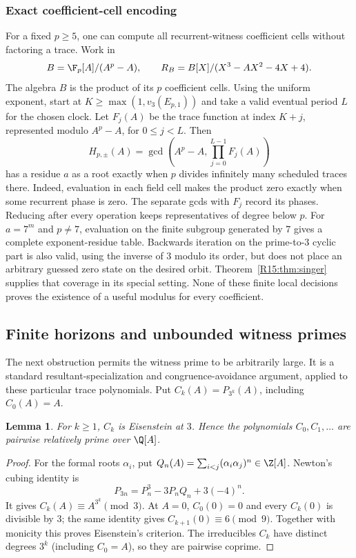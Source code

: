 \documentclass[11pt,a4paper]{article}
\newtheorem{lemma}[theorem]{Lemma}\newtheorem{proposition}[theorem]{Proposition}
\theoremstyle{definition}\newtheorem{definition}[theorem]{Definition}
\theoremstyle{remark}\newtheorem{remark}[theorem]{Remark}
\begin{document}
\subsubsection{Exact coefficient-cell encoding}

For a fixed $p\ge5$, one can compute all recurrent-witness coefficient
cells without factoring a trace. Work in
\[
 B=\F_p[A]/(A^p-A),\qquad
 R_B=B[X]/(X^3-AX^2-4X+4).
\]
The algebra $B$ is the product of its $p$ coefficient cells.
Using the uniform exponent, start at $K\ge\max(1,v_3(E_{p,1}))$
and take a valid eventual period $L$ for the chosen clock.
Let $F_j(A)$ be the trace function at index $K+j$, represented
modulo $A^p-A$, for $0\le j<L$. Then
\begin{equation}\label{R15:eq:witnesspoly}
 H_{p,\pm}(A)=\gcd\left(A^p-A,\prod_{j=0}^{L-1}F_j(A)\right)
\end{equation}
has a residue $a$ as a root exactly when $p$ divides infinitely many
scheduled traces there. Indeed, evaluation in each field cell makes
the product zero exactly when some recurrent phase is zero.
The separate gcds with $F_j$ record its phases. Reducing after every
operation keeps representatives of degree below $p$.
For $a=7^m$ and $p\ne7$, evaluation on the finite subgroup generated
by $7$ gives a complete exponent-residue table. Backwards iteration
on the prime-to-$3$ cyclic part is also valid, using the inverse of
$3$ modulo its order, but does not place an arbitrary guessed zero
state on the desired orbit. Theorem~\ref{R15:thm:singer} supplies that
coverage in its special setting. None of these finite local decisions
proves the existence of a useful modulus for every coefficient.

\subsection{Finite horizons and unbounded witness primes}\label{R15:sec:bounded}

The next obstruction permits the witness prime to be arbitrarily large.
It is a standard resultant-specialization and congruence-avoidance
argument, applied to these particular trace polynomials.
Put $C_k(A)=P_{3^k}(A)$, including $C_0(A)=A$.

\begin{lemma}\label{R15:lem:eisenstein}
For $k\ge1$, $C_k$ is Eisenstein at $3$. Hence the polynomials
$C_0,C_1,\ldots$ are pairwise relatively prime over $\Q[A]$.
\end{lemma}
\begin{proof}
For the formal roots $\alpha_i$, put
$Q_n(A)=\sum_{i<j}(\alpha_i\alpha_j)^n\in\Z[A]$.
Newton's cubing identity is
\[
 P_{3n}=P_n^3-3P_nQ_n+3(-4)^n.
\]
It gives $C_k(A)\equiv A^{3^k}\pmod3$.
At $A=0$, $C_0(0)=0$ and every $C_k(0)$ is divisible by $3$;
the same identity gives $C_{k+1}(0)\equiv6\pmod9$.
Together with monicity this proves Eisenstein's criterion.
The irreducibles $C_k$ have distinct degrees $3^k$ (including
$C_0=A$), so they are pairwise coprime.
\end{proof}
\end{document}
